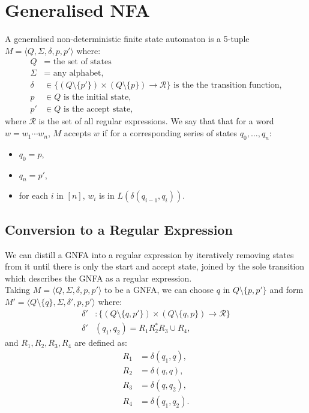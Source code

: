 \section{Generalised NFA}

A generalised non-deterministic finite state automaton is a 5-tuple
$M = \langle Q, \Sigma, \delta, p, p' \rangle$ where:
\begin{align*}
    Q      &= \text{ the set of states} \\
    \Sigma &= \text{ any alphabet,} \\ 
    \delta &\in \big\{ 
        (Q \setminus \{p'\})
        \times 
        (Q \setminus \{p\})
        \to \mathcal{R} 
        \big\} \text{ is the the transition function,} \\
    p      &\in Q \text{ is the initial state,} \\
    p'     &\in Q \text{ is the accept state,}
\end{align*} where $\mathcal{R}$ is the set of all regular
expressions. We say that that for a word $w = w_1 \cdots w_n$,
$M$ accepts $w$ if for a corresponding series of states
$q_0, \ldots, q_n$: \begin{itemize}
    \item $q_0 = p$,
    \item $q_n = p'$,
    \item for each $i$ in $[n]$, $w_i$ is in 
        $L(\delta(q_{i - 1}, q_i))$.
\end{itemize}

\subsection{Conversion to a Regular Expression}

We can distill a GNFA into a regular expression by iteratively
removing states from it until there is only the start and accept
state, joined by the sole transition which describes the GNFA
as a regular expression.
\\[\baselineskip]
Taking $M = \langle Q, \Sigma, \delta, p, p' \rangle$ to be a
GNFA, we can choose $q$ in $Q \setminus \{p, p'\}$ and form
$M' = \langle Q \setminus \{q\}, \Sigma, \delta', p, p' \rangle$
where: \begin{align*}
    \delta'& : \big\{ 
        (Q \setminus \{q, p'\})
        \times 
        (Q \setminus \{q, p\})
        \to \mathcal{R} 
    \big\} \\
    \delta'&(q_1, q_2) = R_1R_2^*R_3 \cup R_4,
\end{align*} and $R_1, R_2, R_3, R_4$ are defined as: \begin{align*}
    R_1 &= \delta(q_1, q), \\
    R_2 &= \delta(q, q), \\
    R_3 &= \delta(q, q_2), \\
    R_4 &= \delta(q_1, q_2).
\end{align*}